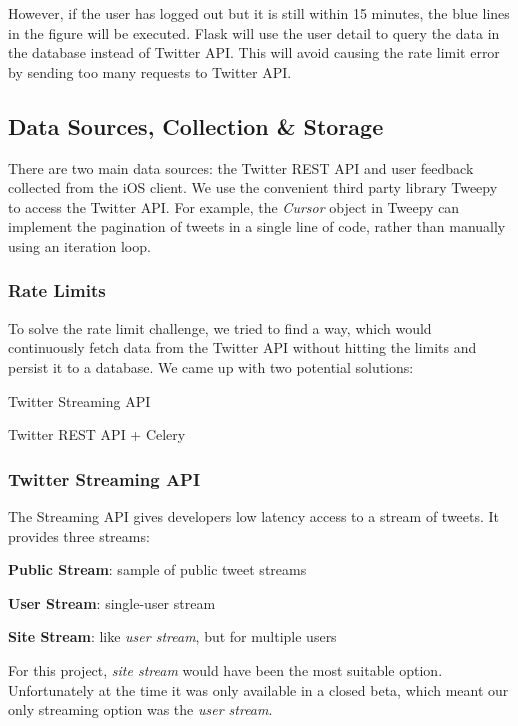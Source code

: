 \documentclass{article}
\begin{document}
However, if the user has logged out but it is still within 15 minutes, the blue lines in the figure will be executed. Flask will use the user detail to query the data in the database instead of Twitter API. This will avoid causing the rate limit error by sending too many requests to Twitter API.



\subsection{Data Sources, Collection \& Storage} 
There are two main data sources: the Twitter REST API and user feedback collected from the iOS client. We use the convenient third party library Tweepy to access the Twitter API. For example, the \textit{Cursor} \cite{cursor} object in Tweepy can implement the pagination of tweets in a single line of code, rather than manually using an iteration loop.

\subsubsection*{Rate Limits} 
To solve the rate limit challenge, we tried to find a way, which would continuously fetch data from the Twitter API without hitting the limits and persist it to a database. We came up with two potential solutions:

\begin{itemize*}
    \item Twitter Streaming API
    \item Twitter REST API + Celery
\end{itemize*}

\subsubsection*{Twitter Streaming API} 
The Streaming API gives developers low latency access to a stream of tweets. It provides three streams: 

\begin{itemize*}
    \item \textbf{Public Stream}: sample of public tweet streams
    \item \textbf{User Stream}: single-user stream
    \item \textbf{Site Stream}: like \textit{user stream}, but for multiple users
\end{itemize*}

\noindent For this project, \textit{site stream} would have been the most suitable option. Unfortunately at the time it was only available in a closed beta, which meant our only streaming option was the \textit{user stream}.
\end{document}
